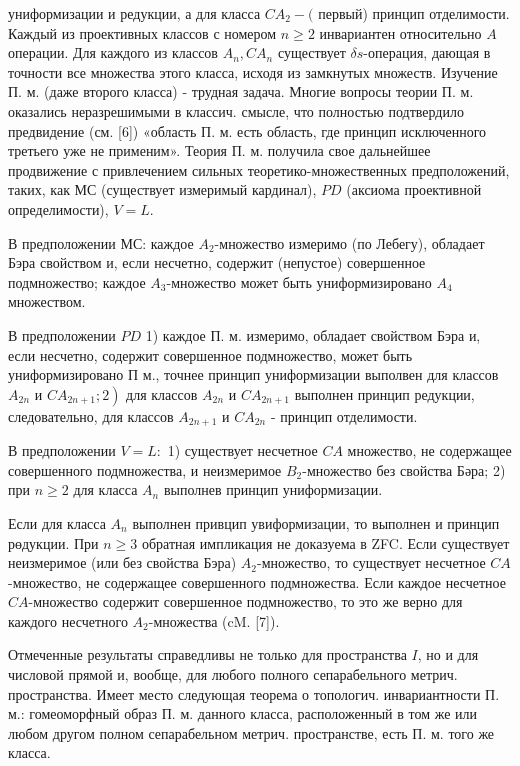 \documentclass[10pt]{article}
\begin{document}
униформизации и редукции, а для класса $C A_{2}-($ первый) принцип отделимости. Каждый из проективных классов с номером $n \geqslant 2$ инвариантен относительно $A$ операции. Для каждого из классов $A_{n}, C A_{n}$ существует $\delta s$-операция, дающая в точности все множества этого класса, исходя из замкнутых множеств. Изучение П. м. (даже второго класса) - трудная задача. Многие вопросы теории П. м. оказались неразрешимыми в классич. смысле, что полностью подтвердило предвидение (см. [6]) «область П. м. есть область, где принцип исключенного третьего уже не применим». Теория П. м. получила свое дальнейшее продвижение с привлечением сильных теоретико-множественных предположений, таких, как МС (существует измеримый кардинал), $P D$ (аксиома проективной определимости), $V=L$.



В предположении МС: каждое $A_{2}$-множество измеримо (по Лебегу), обладает Бэра свойством и, если несчетно, содержит (непустое) совершенное подмножество; каждое $A_{3}$-множество может быть униформизировано $A_{4}$ множеством.



В предположении $P D$ 1) каждое П. м. измеримо, обладает свойством Бэра и, если несчетно, содержит совершенное подмножество, может быть униформизировано П м., точнее принцип униформизации выполвен для классов $A_{2 n}$ и $\left.C A_{2 n+1} ; 2\right)$ для классов $A_{2 n}$ и $C A_{2 n+1}$ выполнен принцип редукции, следовательно, для классов $A_{2 n+1}$ и $C A_{2 n}$ - принцип отделимости.



В предположении $V=L:$ 1) существует несчетное $C A$ множество, не содержащее совершенного подмножества, и неизмеримое $B_{2}$-множество без свойства Бәра; 2) при $n \geqslant 2$ для класса $A_{n}$ выполнев принцип униформизации.



Если для класса $A_{n}$ выполнен привцип увиформизации, то выполнен и принцип рөдукции. При $n \geqslant 3$ обратная импликация не доказуема в ZFC. Если существует неизмеримое (или без свойства Бэра) $A_{2}$-множество, то существует несчетное $C A$-множество, не содержащее совершенного подмножества. Если каждое несчетное $C A$-множество содержит совершенное подмножество, то это же верно для каждого несчетного $A_{2}$-множества (cM. [7]).



Отмеченные результаты справедливы не только для пространства $I$, но и для числовой прямой и, вообще, для любого полного сепарабельного метрич. пространства. Имеет место следующая теорема о топологич. инвариантности П. м.: гомеоморфный образ П. м. данного класса, расположенный в том же или любом другом полном сепарабельном метрич. пространстве, есть П. м. того же класса.
\end{document}
